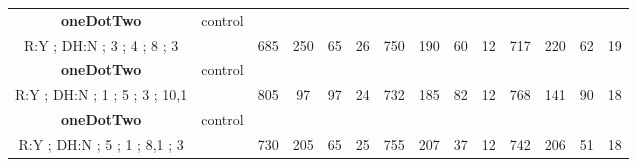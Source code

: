 \begin{table}[H]
{\begin{tabular}{|c|c|c|c|c|c|c|c|c|c|c|c|c|c|}
\cellcolor{blue!15}\textbf{oneDotTwo} & control& {\color[HTML]{00009B} } & {\color[HTML]{9A0000} } & {\color[HTML]{009901} } &  & {\color[HTML]{00009B} } & {\color[HTML]{9A0000} } & {\color[HTML]{009901} } &  & {\color[HTML]{00009B} } & {\color[HTML]{9A0000} } & {\color[HTML]{009901} } &  \\ 
\cellcolor{ blue!15}R:Y ; DH:N ; 3 ; 4 ; 8 ; 3 &  & \multirow{-2}{*}{{\color[HTML]{00009B} 685}} & \multirow{-2}{*}{{\color[HTML]{9A0000} 250}} & \multirow{-2}{*}{{\color[HTML]{009901} 65}} & \multirow{-2}{*}{26} & \multirow{-2}{*}{{\color[HTML]{00009B} 750}} & \multirow{-2}{*}{{\color[HTML]{9A0000} 190}} & \multirow{-2}{*}{{\color[HTML]{009901} 60}} & \multirow{-2}{*}{12} & \multirow{-2}{*}{{\color[HTML]{00009B} 717}} & \multirow{-2}{*}{{\color[HTML]{9A0000} 220}} & \multirow{-2}{*}{{\color[HTML]{009901} 62}} & \multirow{-2}{*}{19} \\ \hline

\cellcolor{blue!15}\textbf{oneDotTwo} & control& {\color[HTML]{00009B} } & {\color[HTML]{9A0000} } & {\color[HTML]{009901} } &  & {\color[HTML]{00009B} } & {\color[HTML]{9A0000} } & {\color[HTML]{009901} } &  & {\color[HTML]{00009B} } & {\color[HTML]{9A0000} } & {\color[HTML]{009901} } &  \\ 
\cellcolor{ blue!15}R:Y ; DH:N ; 1 ; 5 ; 3 ; 10,1 &  & \multirow{-2}{*}{{\color[HTML]{00009B} 805}} & \multirow{-2}{*}{{\color[HTML]{9A0000} 97}} & \multirow{-2}{*}{{\color[HTML]{009901} 97}} & \multirow{-2}{*}{24} & \multirow{-2}{*}{{\color[HTML]{00009B} 732}} & \multirow{-2}{*}{{\color[HTML]{9A0000} 185}} & \multirow{-2}{*}{{\color[HTML]{009901} 82}} & \multirow{-2}{*}{12} & \multirow{-2}{*}{{\color[HTML]{00009B} 768}} & \multirow{-2}{*}{{\color[HTML]{9A0000} 141}} & \multirow{-2}{*}{{\color[HTML]{009901} 90}} & \multirow{-2}{*}{18} \\ \hline

\cellcolor{blue!15}\textbf{oneDotTwo} & control& {\color[HTML]{00009B} } & {\color[HTML]{9A0000} } & {\color[HTML]{009901} } &  & {\color[HTML]{00009B} } & {\color[HTML]{9A0000} } & {\color[HTML]{009901} } &  & {\color[HTML]{00009B} } & {\color[HTML]{9A0000} } & {\color[HTML]{009901} } &  \\ 
\cellcolor{ blue!15}R:Y ; DH:N ; 5 ; 1 ; 8,1 ; 3 &  & \multirow{-2}{*}{{\color[HTML]{00009B} 730}} & \multirow{-2}{*}{{\color[HTML]{9A0000} 205}} & \multirow{-2}{*}{{\color[HTML]{009901} 65}} & \multirow{-2}{*}{25} & \multirow{-2}{*}{{\color[HTML]{00009B} 755}} & \multirow{-2}{*}{{\color[HTML]{9A0000} 207}} & \multirow{-2}{*}{{\color[HTML]{009901} 37}} & \multirow{-2}{*}{12} & \multirow{-2}{*}{{\color[HTML]{00009B} 742}} & \multirow{-2}{*}{{\color[HTML]{9A0000} 206}} & \multirow{-2}{*}{{\color[HTML]{009901} 51}} & \multirow{-2}{*}{18} \\ \hline


\end{tabular}}
\end{table}
